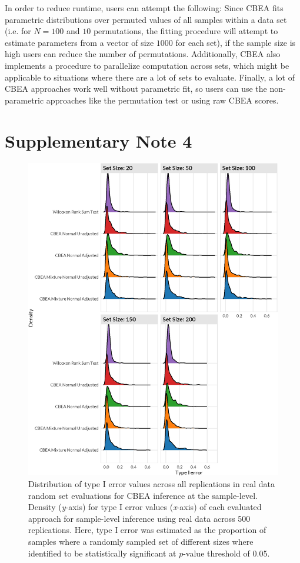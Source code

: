 In order to reduce runtime, users can attempt the following: Since CBEA fits parametric distributions over permuted values of all samples within a data set (i.e. for $N = 100$ and $10$ permutations, the fitting procedure will attempt to estimate parameters from a vector of size $1000$ for each set), if the sample size is high users can reduce the number of permutations. Additionally, CBEA also implements a procedure to parallelize computation across sets, which might be applicable to situations where there are a lot of sets to evaluate. Finally, a lot of CBEA approaches work well without parametric fit, so users can use the non-parametric approaches like the permutation test or using raw CBEA scores. 

\section{Supplementary Note 4} \label{appC_note4}

\begin{figure}[!h]
    \centering
    \includegraphics[width=0.90\linewidth]{figures/appC_fs7.eps}
    \caption[Distribution of type I error values across all replications in real data random set evaluations for CBEA inference at the sample-level]{Distribution of type I error values across all replications in real data random set evaluations for CBEA inference at the sample-level. Density (\emph{y}-axis) for type I error values (\emph{x}-axis) of each evaluated approach for sample-level inference using real data across 500 replications. Here, type I error was estimated as the proportion of samples where a randomly sampled set of different sizes where identified to be statistically significant at $p$-value threshold of 0.05.}
    \label{fig:c7}
\end{figure}